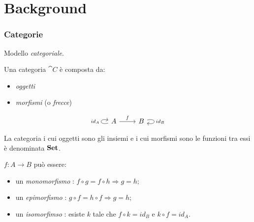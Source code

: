 \documentclass[8pt]{beamer}
\begin{document}
\section{Background}
\begin{frame}[fragile]\frametitle{Categorie} %
	Modello \emph{categoriale}.

	\smallskip

        Una categoria $\cat C$ è composta da:
	\begin{itemize}\item\emph{oggetti}\item\emph{morfismi} (o \emph{frecce})\end{itemize}
        \[
                \begin{tikzcd} A \arrow[loop left, "{id_A}"] \arrow[r, "f"] & B \arrow[loop right, "{id_B}"] \end{tikzcd}
        \]

        \smallskip
        
        La categoria i cui oggetti sono gli insiemi e i cui morfismi sono le funzioni tra essi è denominata $\mathbf{Set}$.
        
        \smallskip

        $f: A \to B$ può essere:
        \begin{itemize}
                \item un \emph{monomorfismo} : $f \circ g = f \circ h \Rightarrow g = h$;
                \item un \emph{epimorfismo} : $g \circ f = h \circ f \Rightarrow g = h$;
                \item un \emph{isomorfimso} : esiste $k$ tale che $f \circ k = id_B$ e $k \circ f = id_A$.
        \end{itemize}

\end{frame}
\end{document}
